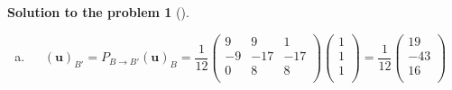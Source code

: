 \documentclass[12pt,a4]{article}
\newtheorem{solution}{Solution to the problem}
\newcommand{\bu}{{\mathbf u}}
\begin{document}
\begin{solution}[]
\begin{enumerate}[(a)]
$(\bu)_B = P_{R \to B} \bu = P_{B \to R}^{-1} \bu$. We have to find the $P_{B \to R}^{-1}$:
\[
\det P_{B \to R} = 6+54+6-18=48
\]
\[
P_{B \to R}^{-1} = \frac{1}{48}
\begin{pmatrix}
 4 & -18 &  6 \\
-4 &   6 &  6 \\
-20 & 18 & -6 \\
\end{pmatrix}^\top = \frac{1}{24}
\begin{pmatrix}
 2 & -2 & -10 \\
-9 &  3 & 9 \\
 3 &  3 & -3 \\
\end{pmatrix}
\]
Hence
\[
(\bu)_B = \frac{1}{24}
\begin{pmatrix}
 2 & -2 & -10 \\
-9 &  3 & 9 \\
 3 &  3 & -3 \\
\end{pmatrix}
\begin{pmatrix}-5\\8\\-5\\\end{pmatrix} = \frac{1}{24}
\begin{pmatrix}24\\24\\24\\\end{pmatrix} = \begin{pmatrix}1\\1\\1\\\end{pmatrix} 
\]
\item
\[
(\bu)_{B'} = P_{B \to B'} (\bu)_B = \frac{1}{12}
\begin{pmatrix}
 9 &  9  &   1 \\
-9 & -17 & -17 \\
 0 &  8  &  8 \\
\end{pmatrix} \begin{pmatrix}1\\1\\1\\\end{pmatrix} = \frac{1}{12}
\begin{pmatrix} 19 \\ -43 \\ 16 \\ \end{pmatrix} 
\]
\end{enumerate}
\end{solution}
\end{document}
